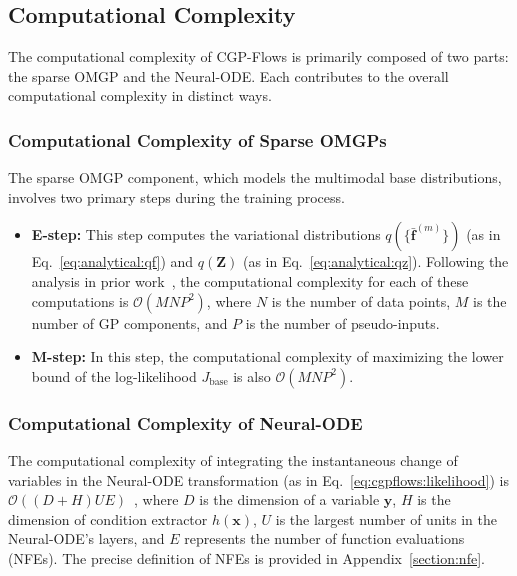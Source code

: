 \documentclass[sn-mathphys-num]{sn-jnl}
\begin{document}
\subsection{Computational Complexity}
The computational complexity of CGP-Flows is primarily composed of two parts: the sparse OMGP and the Neural-ODE. Each contributes to the overall computational complexity in distinct ways.

\subsubsection{Computational Complexity of Sparse OMGPs}
The sparse OMGP component, which models the multimodal base distributions, involves two primary steps during the training process.

\begin{itemize}
    \item \textbf{E-step:} This step computes the variational distributions \( q(\{\bar{\mathbf{f}}^{(m)}\}) \) (as in Eq.~\ref{eq:analytical:qf}) and \( q(\mathbf{Z}) \) (as in Eq.~\ref{eq:analytical:qz}). Following the analysis in prior work~\cite{sasaki2021variational}, the computational complexity for each of these computations is \(\mathcal{O}(MNP^2)\), where \(N\) is the number of data points, \(M\) is the number of GP components, and \(P\) is the number of pseudo-inputs.

    \item \textbf{M-step:} In this step, the computational complexity of maximizing the lower bound of the log-likelihood \( J_\mathrm{base} \) is also \(\mathcal{O}(MNP^2)\).
\end{itemize}

\subsubsection{Computational Complexity of Neural-ODE}
The computational complexity of integrating the instantaneous change of variables in the Neural-ODE transformation (as in Eq.~\ref{eq:cgpflows:likelihood}) is \(\mathcal{O}((D+H)UE)\)~\cite{grathwohl2018ffjord}, where \(D\) is the dimension of 
 a variable $\mathbf y$, \(H\) is the dimension of condition extractor $h(\mathbf x)$, \(U\) is the largest number of units in the Neural-ODE's layers, and \(E\) represents the number of function evaluations (NFEs). The precise definition of NFEs is provided in Appendix~\ref{section:nfe}.
\end{document}

